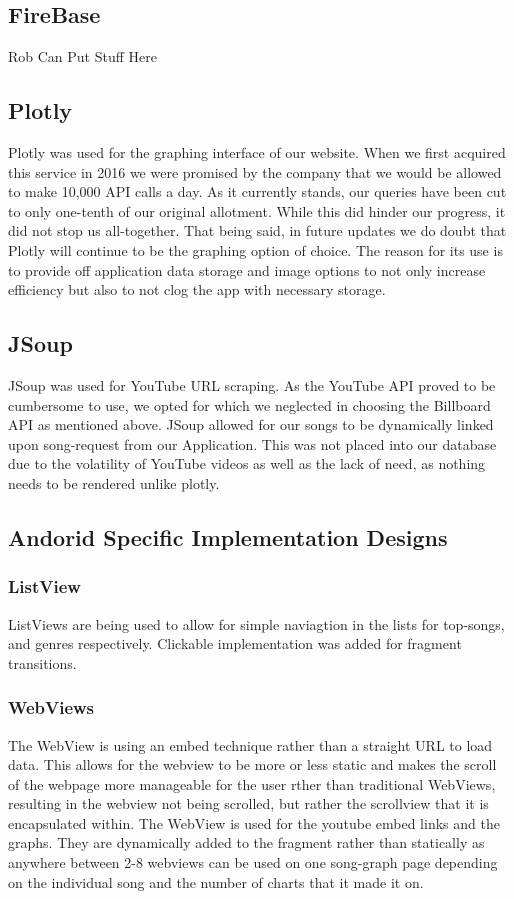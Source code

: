 \documentclass{article}
\begin{document}
\subsection*{FireBase}





Rob Can Put Stuff Here





\subsection*{Plotly}
Plotly was used for the graphing interface of our website.
When we first acquired this service in 2016 we were promised by the company that we would be allowed to make 10,000 API calls a day.
As it currently stands, our queries have been cut to only one-tenth of our original allotment. While this did hinder our progress, it did not stop us all-together. That being said, in future updates we do doubt that Plotly will continue to be the graphing option of choice.
The reason for its use is to provide off application data storage and image options to not only increase efficiency but also to not clog the app with necessary storage.
\subsection*{JSoup}
JSoup was used for YouTube URL scraping.
As the YouTube API proved to be cumbersome to use, we opted for which we neglected in choosing the Billboard API as mentioned above.
JSoup allowed for our songs to be dynamically linked upon song-request from our Application.
This was not placed into our database due to the volatility of YouTube videos as well as the lack of need, as nothing needs to be rendered unlike plotly.
\subsection*{Andorid Specific Implementation Designs}

\subsubsection*{ListView}
ListViews are being used to allow for simple naviagtion in the lists for top-songs, and genres respectively. Clickable implementation was added for fragment transitions.

\subsubsection*{WebViews}
The WebView is using an embed technique rather than a straight URL to load data. 
This allows for the webview to be more or less static and makes the scroll of the webpage more manageable for the user rther than traditional WebViews,
resulting in the webview not being scrolled, but rather the scrollview that it is encapsulated within.
The WebView is used for the youtube embed links and the graphs. 
They are dynamically added to the fragment rather than statically as anywhere between 2-8 webviews can be used on one song-graph page depending on the individual
song and the number of charts that it made it on. 
\end{document}
